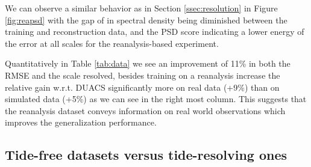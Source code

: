 \begin{bibunit}
We can observe a similar behavior as in Section \ref{ssec:resolution} in Figure \ref{fig:reapsd} with the gap of in spectral density being diminished between the training and reconstruction data, and the PSD score indicating a lower energy of the error at all scales for the reanalysis-based experiment.

Quantitatively in Table \ref{tab:data} we see an improvement of 11\% in both the RMSE and the scale resolved, besides training on a reanalysis increase the relative gain w.r.t. DUACS significantly more on real data (+9\%) than on simulated data (+5\%) as we can see in the right most column. This suggests that the reanalysis dataset conveys information on real world observations which improves the generalization performance.

\subsection{Tide-free datasets versus tide-resolving ones}
\label{ssec:tide}







\end{bibunit}
